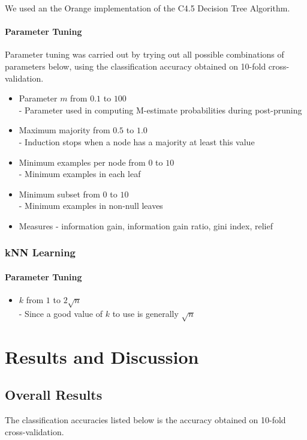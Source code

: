 \documentclass[]{article}
\begin{document}
We used an the Orange implementation of the C4.5 Decision Tree Algorithm.

\paragraph{Parameter Tuning}
Parameter tuning was carried out by trying out all possible combinations of parameters below, using the classification accuracy obtained on 10-fold cross-validation.

\begin{itemize}
	\item Parameter $m$ from $0.1$ to $100$ \\
		- Parameter used in computing M-estimate probabilities during post-pruning
	\item Maximum majority from $0.5$ to $1.0$ \\
		- Induction stops when a node has a majority at least this value
	\item Minimum examples per node from $0$ to $10$ \\
		- Minimum examples in each leaf
	\item Minimum subset from $0$ to $10$ \\
		- Minimum examples in non-null leaves
	\item Measures - information gain, information gain ratio, gini index, relief %
\end{itemize}

\subsubsection{kNN Learning}

\paragraph{Parameter Tuning}
\begin{itemize}
	\item $k$ from $1$ to $2\sqrt{n}$ \\
		- Since a good value of $k$ to use is generally $\sqrt{n}$
\end{itemize}

\section{Results and Discussion}

\subsection{Overall Results}
The classification accuracies listed below is the accuracy obtained on 10-fold cross-validation.
\end{document}
